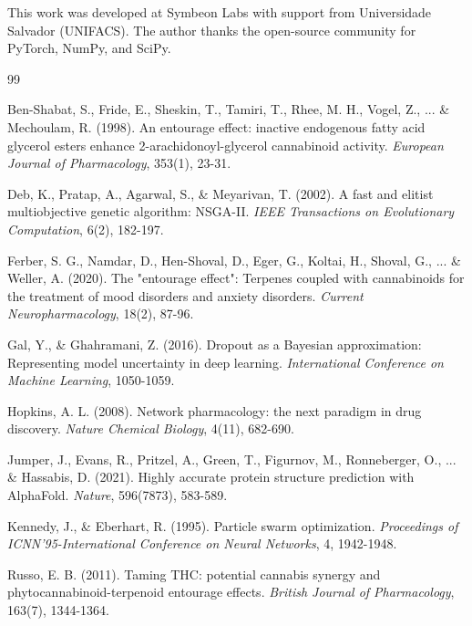 \documentclass[12pt, a4paper]{article}
\begin{document}
This work was developed at Symbeon Labs with support from Universidade Salvador (UNIFACS). The author thanks the open-source community for PyTorch, NumPy, and SciPy.


\begin{thebibliography}{99}

Ben-Shabat, S., Fride, E., Sheskin, T., Tamiri, T., Rhee, M. H., Vogel, Z., ... \& Mechoulam, R. (1998).
\newblock An entourage effect: inactive endogenous fatty acid glycerol esters enhance 2-arachidonoyl-glycerol cannabinoid activity.
\newblock \textit{European Journal of Pharmacology}, 353(1), 23-31.

Deb, K., Pratap, A., Agarwal, S., \& Meyarivan, T. (2002).
\newblock A fast and elitist multiobjective genetic algorithm: NSGA-II.
\newblock \textit{IEEE Transactions on Evolutionary Computation}, 6(2), 182-197.

Ferber, S. G., Namdar, D., Hen-Shoval, D., Eger, G., Koltai, H., Shoval, G., ... \& Weller, A. (2020).
\newblock The "entourage effect": Terpenes coupled with cannabinoids for the treatment of mood disorders and anxiety disorders.
\newblock \textit{Current Neuropharmacology}, 18(2), 87-96.

Gal, Y., \& Ghahramani, Z. (2016).
\newblock Dropout as a Bayesian approximation: Representing model uncertainty in deep learning.
\newblock \textit{International Conference on Machine Learning}, 1050-1059.

Hopkins, A. L. (2008).
\newblock Network pharmacology: the next paradigm in drug discovery.
\newblock \textit{Nature Chemical Biology}, 4(11), 682-690.

Jumper, J., Evans, R., Pritzel, A., Green, T., Figurnov, M., Ronneberger, O., ... \& Hassabis, D. (2021).
\newblock Highly accurate protein structure prediction with AlphaFold.
\newblock \textit{Nature}, 596(7873), 583-589.

Kennedy, J., \& Eberhart, R. (1995).
\newblock Particle swarm optimization.
\newblock \textit{Proceedings of ICNN'95-International Conference on Neural Networks}, 4, 1942-1948.

Russo, E. B. (2011).
\newblock Taming THC: potential cannabis synergy and phytocannabinoid-terpenoid entourage effects.
\newblock \textit{British Journal of Pharmacology}, 163(7), 1344-1364.


\end{thebibliography}
\end{document}
